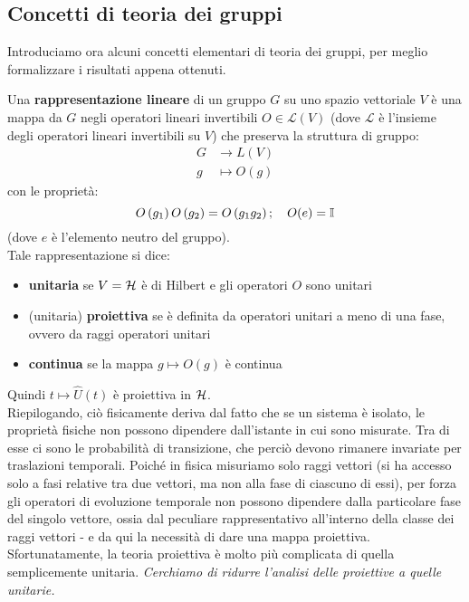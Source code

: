 \documentclass[../../FisicaTeorica.tex]{subfiles}
\begin{document}
\subsection{Concetti di teoria dei gruppi}
Introduciamo ora alcuni concetti elementari di teoria dei gruppi, per meglio formalizzare i risultati appena ottenuti. 
\begin{dfn}
Una \textbf{rappresentazione lineare} di un gruppo $G$ su uno spazio vettoriale $V$ è una mappa da $G$ negli operatori lineari invertibili $O\in \mathcal{L}(V)$ (dove $\mathcal{L}$ è l'insieme degli operatori lineari invertibili su $V$) che preserva la struttura di gruppo:
\begin{align*}
    G&\to L\left(V\right)\\
g&\mapsto O\left(g\right)
\end{align*}
con le proprietà:
\[
O\left(g_1\right)O\left(g_2\right)=O\left(g_1g_2\right); \quad O(e) = \mathbb{I}
\]
(dove $e$ è l'elemento neutro del gruppo).\\
Tale rappresentazione si dice:
\begin{itemize}
    \item \textbf{unitaria} se $V=\mathcal{H}$ è di Hilbert e gli operatori $O$ sono unitari
    \item (unitaria) \textbf{proiettiva} se è definita da operatori unitari a meno di una fase, ovvero da raggi operatori unitari
    \item \textbf{continua} se la mappa $g\mapsto O(g)$ è continua
\end{itemize}
\end{dfn}
Quindi $t\mapsto \hat{U}(t)$ è proiettiva in $\mathcal{H}$.\\
Riepilogando, ciò fisicamente deriva dal fatto che se un sistema è isolato, le proprietà fisiche non possono dipendere dall'istante in cui sono misurate. Tra di esse ci sono le probabilità di transizione, che perciò devono rimanere invariate per traslazioni temporali. Poiché in fisica misuriamo solo raggi vettori (si ha accesso solo a fasi relative tra due vettori, ma non alla fase  di ciascuno di essi), per forza gli operatori di evoluzione temporale non possono dipendere dalla particolare fase  del singolo vettore, ossia dal peculiare rappresentativo all'interno della classe dei raggi vettori - e da qui la necessità di dare una mappa proiettiva.\\
Sfortunatamente, la teoria proiettiva è molto più complicata di quella semplicemente unitaria.
\textit{Cerchiamo di ridurre l'analisi delle proiettive a quelle unitarie.}\\
\end{document}
